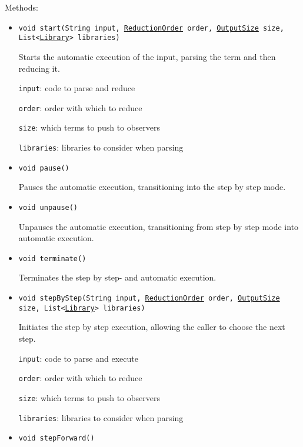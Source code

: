 Methods:
\begin{itemize}
\item \texttt{void start(String input, \hyperref[type:edu.kit.wavelength.client.model.reduction.ReductionOrder]{ReductionOrder} order, \hyperref[type:edu.kit.wavelength.client.model.output.OutputSize]{OutputSize} size, List<\hyperref[type:edu.kit.wavelength.client.model.library.Library]{Library}> libraries)}

Starts the automatic execution of the input, parsing the term and then
 reducing it.

\texttt{input}: code to parse and reduce

\texttt{order}: order with which to reduce

\texttt{size}: which terms to push to observers

\texttt{libraries}: libraries to consider when parsing

\item \texttt{void pause()}

Pauses the automatic execution, transitioning into the step by step mode.

\item \texttt{void unpause()}

Unpauses the automatic execution, transitioning from step by step mode into
 automatic execution.

\item \texttt{void terminate()}

Terminates the step by step- and automatic execution.

\item \texttt{void stepByStep(String input, \hyperref[type:edu.kit.wavelength.client.model.reduction.ReductionOrder]{ReductionOrder} order, \hyperref[type:edu.kit.wavelength.client.model.output.OutputSize]{OutputSize} size, List<\hyperref[type:edu.kit.wavelength.client.model.library.Library]{Library}> libraries)}

Initiates the step by step execution, allowing the caller to choose the next
 step.

\texttt{input}: code to parse and execute

\texttt{order}: order with which to reduce

\texttt{size}: which terms to push to observers

\texttt{libraries}: libraries to consider when parsing

\item \texttt{void stepForward()}


\end{itemize}
